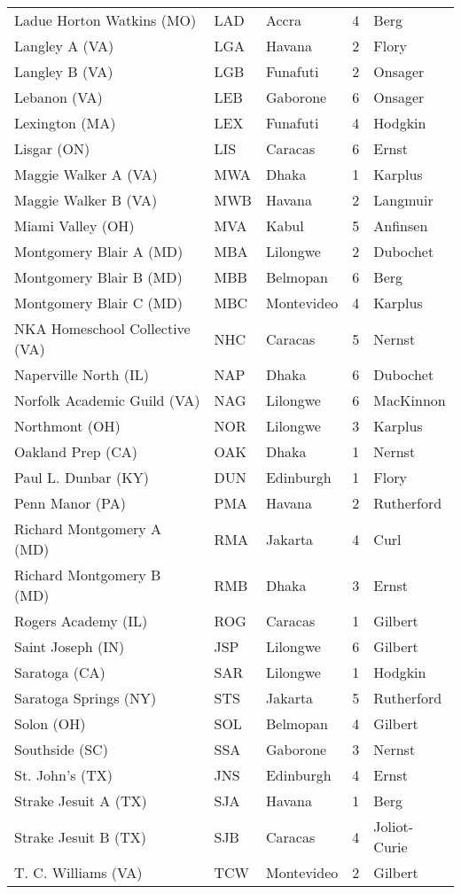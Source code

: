 \documentclass{article}%
\begin{document}
\begin{longtable}{|ll|ll|l|}
Ladue Horton Watkins (MO)&LAD&Accra&4&Berg\\%
Langley A (VA)&LGA&Havana&2&Flory\\%
Langley B (VA)&LGB&Funafuti&2&Onsager\\%
Lebanon (VA)&LEB&Gaborone&6&Onsager\\%
Lexington (MA)&LEX&Funafuti&4&Hodgkin\\%
Lisgar (ON)&LIS&Caracas&6&Ernst\\%
Maggie Walker A (VA)&MWA&Dhaka&1&Karplus\\%
Maggie Walker B (VA)&MWB&Havana&2&Langmuir\\%
Miami Valley (OH)&MVA&Kabul&5&Anfinsen\\%
Montgomery Blair A (MD)&MBA&Lilongwe&2&Dubochet\\%
Montgomery Blair B (MD)&MBB&Belmopan&6&Berg\\%
Montgomery Blair C (MD)&MBC&Montevideo&4&Karplus\\%
NKA Homeschool Collective (VA)&NHC&Caracas&5&Nernst\\%
Naperville North (IL)&NAP&Dhaka&6&Dubochet\\%
Norfolk Academic Guild (VA)&NAG&Lilongwe&6&MacKinnon\\%
Northmont (OH)&NOR&Lilongwe&3&Karplus\\%
Oakland Prep (CA)&OAK&Dhaka&1&Nernst\\%
Paul L. Dunbar (KY)&DUN&Edinburgh&1&Flory\\%
Penn Manor (PA)&PMA&Havana&2&Rutherford\\%
Richard Montgomery A (MD)&RMA&Jakarta&4&Curl\\%
Richard Montgomery B (MD)&RMB&Dhaka&3&Ernst\\%
Rogers Academy (IL)&ROG&Caracas&1&Gilbert\\%
Saint Joseph (IN)&JSP&Lilongwe&6&Gilbert\\%
Saratoga (CA)&SAR&Lilongwe&1&Hodgkin\\%
Saratoga Springs (NY)&STS&Jakarta&5&Rutherford\\%
Solon (OH)&SOL&Belmopan&4&Gilbert\\%
Southside (SC)&SSA&Gaborone&3&Nernst\\%
St. John's (TX)&JNS&Edinburgh&4&Ernst\\%
Strake Jesuit A (TX)&SJA&Havana&1&Berg\\%
Strake Jesuit B (TX)&SJB&Caracas&4&Joliot{-}Curie\\%
T. C. Williams (VA)&TCW&Montevideo&2&Gilbert\\%

\end{longtable}
\end{document}
